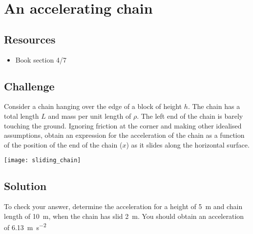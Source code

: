 \newpage
\section{An accelerating chain}

\subsection*{Resources}
\begin{itemize}
    \item Book section 4/7
\end{itemize}

\subsection*{Challenge}
Consider a chain hanging over the edge of a block of height $h$.  The chain has a total length $L$ and mass per unit length of $\rho$. The left end of the chain is barely touching the ground. Ignoring friction at the corner and making other idealised assumptions, obtain an expression for the acceleration of the chain as a function of the position of the end of the chain ($x$) as it slides along the horizontal surface.

\texttt{[image: sliding\_chain]}

\subsection*{Solution}
To check your answer, determine the acceleration for a height of \SI{5}{\meter} and chain length of \SI{10}{\meter}, when the chain has slid \SI{2}{m}. You should obtain an acceleration of \SI{6.13}{\meter\per\square\second}
\fi
